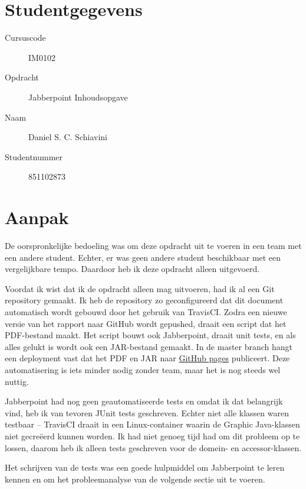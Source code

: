 \documentclass[a4paper]{article}
\begin{document}
\pagestyle{fancy}

\section*{Studentgegevens}
    \begin{description}
        \item [Cursuscode] IM0102
        \item [Opdracht] Jabberpoint Inhoudsopgave
        \item [Naam] Daniel S. C. Schiavini
        \item [Studentnummer] 851102873
    \end{description}

\section*{Aanpak}
    De oorspronkelijke bedoeling was om deze opdracht uit te voeren in een team met een andere student.
    Echter, er was geen andere student beschikbaar met een vergelijkbare tempo.
    Daardoor heb ik deze opdracht alleen uitgevoerd.

    Voordat ik wist dat ik de opdracht alleen mag uitvoeren, had ik al een Git repository gemaakt.
    Ik heb de repository zo geconfigureerd dat dit document automatisch wordt gebouwd door het gebruik van TravisCI.
    Zodra een nieuwe versie van het rapport naar GitHub wordt gepushed, draait een script dat het PDF-bestand maakt.
    Het script bouwt ook Jabberpoint, draait unit tests, en als alles gelukt is wordt ook een JAR-bestand gemaakt.
    In de master branch hangt een deployment vast dat het PDF en JAR naar \href{https://github.com/DanielSchiavini/design-patterns-assignment/tree/gh-pages}{GitHub pages} publiceert.
    Deze automatisering is iets minder nodig zonder team, maar het is nog steeds wel nuttig.

    Jabberpoint had nog geen geautomatiseerde tests en omdat ik dat belangrijk vind, heb ik van tevoren JUnit tests geschreven.
    Echter niet alle klassen waren testbaar -- TravisCI draait in een Linux-container waarin de Graphic Java-klassen niet gecreëerd kunnen worden.
    Ik had niet genoeg tijd had om dit probleem op te lossen, daarom heb ik alleen tests geschreven voor de domein- en accessor-klassen.

    Het schrijven van de tests was een goede hulpmiddel om Jabberpoint te leren kennen en om het probleemanalyse van de volgende sectie uit te voeren.
\end{document}
